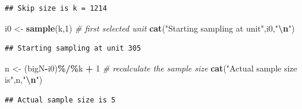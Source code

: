 \documentclass[
]{book}
\newenvironment{Shaded}{\begin{snugshade}}{\end{snugshade}}
\newcommand{\CommentTok}[1]{\textcolor[rgb]{0.56,0.35,0.01}{\textit{#1}}}
\newcommand{\DecValTok}[1]{\textcolor[rgb]{0.00,0.00,0.81}{#1}}
\newcommand{\FunctionTok}[1]{\textcolor[rgb]{0.13,0.29,0.53}{\textbf{#1}}}
\newcommand{\NormalTok}[1]{#1}
\newcommand{\OtherTok}[1]{\textcolor[rgb]{0.56,0.35,0.01}{#1}}
\newcommand{\SpecialCharTok}[1]{\textcolor[rgb]{0.81,0.36,0.00}{\textbf{#1}}}
\newcommand{\StringTok}[1]{\textcolor[rgb]{0.31,0.60,0.02}{#1}}
\begin{document}
\begin{verbatim}
## Skip size is k = 1214
\end{verbatim}

\begin{Shaded}
\begin{Highlighting}[]
\NormalTok{i0 }\OtherTok{\textless{}{-}} \FunctionTok{sample}\NormalTok{(k,}\DecValTok{1}\NormalTok{) }\CommentTok{\# first selected unit}
\FunctionTok{cat}\NormalTok{(}\StringTok{"Starting sampling at unit"}\NormalTok{,i0,}\StringTok{"}\SpecialCharTok{\textbackslash{}n}\StringTok{"}\NormalTok{)}
\end{Highlighting}
\end{Shaded}

\begin{verbatim}
## Starting sampling at unit 305
\end{verbatim}

\begin{Shaded}
\begin{Highlighting}[]
\NormalTok{n }\OtherTok{\textless{}{-}}\NormalTok{ (bigN}\SpecialCharTok{{-}}\NormalTok{i0)}\SpecialCharTok{\%/\%}\NormalTok{k }\SpecialCharTok{+} \DecValTok{1} \CommentTok{\# recalculate the sample size}
\FunctionTok{cat}\NormalTok{(}\StringTok{"Actual sample size is"}\NormalTok{,n,}\StringTok{"}\SpecialCharTok{\textbackslash{}n}\StringTok{"}\NormalTok{)}
\end{Highlighting}
\end{Shaded}

\begin{verbatim}
## Actual sample size is 5
\end{verbatim}

\begin{Shaded}
\end{Shaded}
\end{document}
